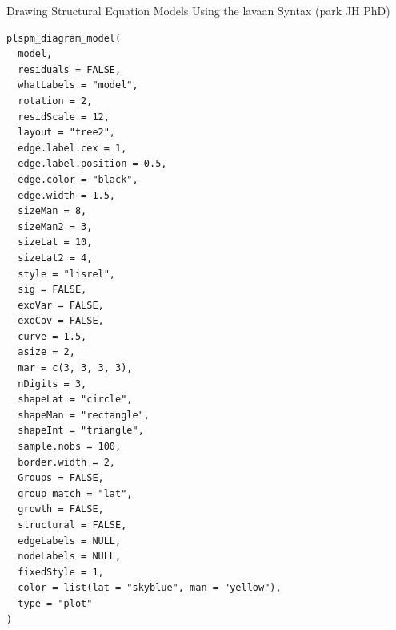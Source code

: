 \documentclass[a4paper]{book}
\begin{document}
%
\begin{Description}
Drawing Structural Equation Models Using the lavaan Syntax (park JH PhD)
\end{Description}
%
\begin{Usage}
\begin{verbatim}
plspm_diagram_model(
  model,
  residuals = FALSE,
  whatLabels = "model",
  rotation = 2,
  residScale = 12,
  layout = "tree2",
  edge.label.cex = 1,
  edge.label.position = 0.5,
  edge.color = "black",
  edge.width = 1.5,
  sizeMan = 8,
  sizeMan2 = 3,
  sizeLat = 10,
  sizeLat2 = 4,
  style = "lisrel",
  sig = FALSE,
  exoVar = FALSE,
  exoCov = FALSE,
  curve = 1.5,
  asize = 2,
  mar = c(3, 3, 3, 3),
  nDigits = 3,
  shapeLat = "circle",
  shapeMan = "rectangle",
  shapeInt = "triangle",
  sample.nobs = 100,
  border.width = 2,
  Groups = FALSE,
  group_match = "lat",
  growth = FALSE,
  structural = FALSE,
  edgeLabels = NULL,
  nodeLabels = NULL,
  fixedStyle = 1,
  color = list(lat = "skyblue", man = "yellow"),
  type = "plot"
)
\end{verbatim}
\end{Usage}
%
\end{document}
